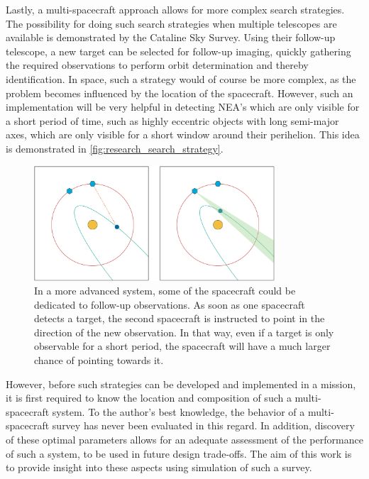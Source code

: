 Lastly, a multi-spacecraft approach allows for more complex search strategies. The possibility for doing such search strategies when multiple telescopes are available is demonstrated by the Cataline Sky Survey. Using their follow-up telescope, a new target can be selected for follow-up imaging, quickly gathering the required observations to perform orbit determination and thereby identification. In space, such a strategy would of course be more complex, as the problem becomes influenced by the location of the spacecraft. However, such an implementation will be very helpful in detecting NEA's which are only visible for a short period of time, such as highly eccentric objects with long semi-major axes, which are only visible for a short window around their perihelion. This idea is demonstrated in \autoref{fig:research_search_strategy}.\\

\begin{figure}[htbp]
 \centering
 \includegraphics[width=0.8\textwidth]{img/research_search_strategy.png}
 \caption{In a more advanced system, some of the spacecraft could be dedicated to follow-up observations. As soon as one spacecraft detects a target, the second spacecraft is instructed to point in the direction of the new observation. In that way, even if a target is only observable for a short period, the spacecraft will have a much larger chance of pointing towards it.}
 \label{fig:research_search_strategy}
\end{figure}


However, before such strategies can be developed and implemented in a mission, it is first required to know the location and composition of such a multi-spacecraft system. To the author's best knowledge, the behavior of a multi-spacecraft survey has never been evaluated in this regard. In addition, discovery of these optimal parameters allows for an adequate assessment of the performance of such a system, to be used in future design trade-offs. The aim of this work is to provide insight into these aspects using simulation of such a survey.

